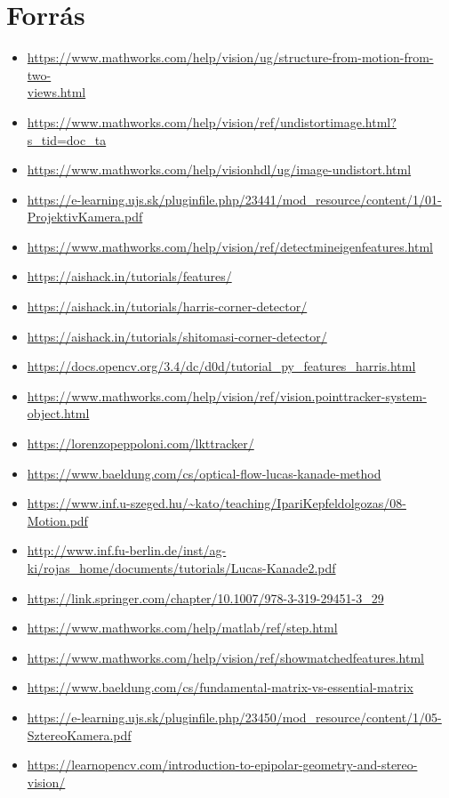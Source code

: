 \documentclass[12pt]{report}
\begin{document}
    \chapter{Forrás}
        \begin{itemize}
            \item \url{https://www.mathworks.com/help/vision/ug/structure-from-motion-from-two-}\\\url{views.html}
            \item \url{https://www.mathworks.com/help/vision/ref/undistortimage.html?s_tid=doc_ta}
            \item \url{https://www.mathworks.com/help/visionhdl/ug/image-undistort.html}
            \item \url{https://e-learning.ujs.sk/pluginfile.php/23441/mod_resource/content/1/01-ProjektivKamera.pdf}
            \item \url{https://www.mathworks.com/help/vision/ref/detectmineigenfeatures.html}
            \item \url{https://aishack.in/tutorials/features/}
            \item \url{https://aishack.in/tutorials/harris-corner-detector/}
            \item \url{https://aishack.in/tutorials/shitomasi-corner-detector/}
            \item \url{https://docs.opencv.org/3.4/dc/d0d/tutorial_py_features_harris.html}
            \item \url{https://www.mathworks.com/help/vision/ref/vision.pointtracker-system-object.html}
            \item \url{https://lorenzopeppoloni.com/lkttracker/}
            \item \url{https://www.baeldung.com/cs/optical-flow-lucas-kanade-method}
            \item \url{https://www.inf.u-szeged.hu/~kato/teaching/IpariKepfeldolgozas/08-Motion.pdf}
            \item \url{http://www.inf.fu-berlin.de/inst/ag-ki/rojas_home/documents/tutorials/Lucas-Kanade2.pdf}
            \item \url{https://link.springer.com/chapter/10.1007/978-3-319-29451-3_29}
            \item \url{https://www.mathworks.com/help/matlab/ref/step.html}
            \item \url{https://www.mathworks.com/help/vision/ref/showmatchedfeatures.html}
            \item \url{https://www.baeldung.com/cs/fundamental-matrix-vs-essential-matrix}
            \item \url{https://e-learning.ujs.sk/pluginfile.php/23450/mod_resource/content/1/05-SztereoKamera.pdf}
            \item \url{https://learnopencv.com/introduction-to-epipolar-geometry-and-stereo-vision/}
        \end{itemize}
\end{document}

